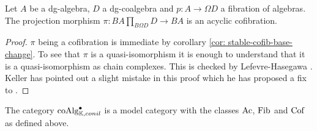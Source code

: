 \documentclass[../thesis.tex]{subfiles}
\begin{document}
            \begin{lemma}\label{lem: tech-fac}
                Let $A$ be a dg-algebra, $D$ a dg-coalgebra and $p: A \rightarrow \Omega D$ a fibration of algebras. The projection morphism $\pi : BA\prod_{B\Omega D}D \rightarrow BA$ is an acyclic cofibration.
                \begin{center}
                \end{center}
            \end{lemma}

            \begin{proof}
                $\pi$ being a cofibration is immediate by corollary \ref{cor: stable-cofib-base-change}. To see that $\pi$ is a quasi-isomorphism it is enough to understand that it is a quasi-isomorphism as chain complexes. This is checked by Lefevre-Hasegawa \cite{LefevreHasegawa03}. Keller has pointed out a slight mistake in this proof which he has proposed a fix to \cite{Keller06}.
            \end{proof}

            \begin{thm}\label{thm: model-coalg}
                The category $\tt{coAlg}^\bullet_{\mathbb{K}, conil}$ is a model category with the classes $\tt{Ac}$, $\tt{Fib}$ and $\tt{Cof}$ as defined above.
            \end{thm}
\end{document}
